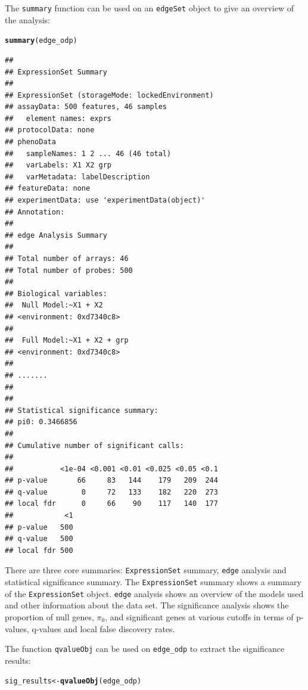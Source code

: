 \documentclass{article}\usepackage[]{graphicx}\usepackage[]{color}
\makeatletter
\newcommand{\hlstd}[1]{\textcolor[rgb]{0.345,0.345,0.345}{#1}}%
\newcommand{\hlkwb}[1]{\textcolor[rgb]{0.69,0.353,0.396}{#1}}%
\newcommand{\hlkwd}[1]{\textcolor[rgb]{0.737,0.353,0.396}{\textbf{#1}}}%
\newenvironment{kframe}{%
 \def\at@end@of@kframe{}%
 \ifinner\ifhmode%
  \def\at@end@of@kframe{\end{minipage}}%
  \begin{minipage}{\columnwidth}%
 \fi\fi%
 \def\FrameCommand##1{\hskip\@totalleftmargin \hskip-\fboxsep
 \colorbox{shadecolor}{##1}\hskip-\fboxsep
     \hskip-\linewidth \hskip-\@totalleftmargin \hskip\columnwidth}%
 \MakeFramed {\advance\hsize-\width
   \@totalleftmargin\z@ \linewidth\hsize
   \@setminipage}}%
 {\par\unskip\endMakeFramed%
 \at@end@of@kframe}
\newenvironment{knitrout}{}{} %
\makeatother
\begin{document}
The {\tt summary} function can be used on an {\tt edgeSet} object to give an overview of the analysis:
\begin{knitrout}
\color{fgcolor}\begin{kframe}
\begin{alltt}
\hlkwd{summary}\hlstd{(edge_odp)}
\end{alltt}
\begin{verbatim}
## 
## ExpressionSet Summary 
##  
## ExpressionSet (storageMode: lockedEnvironment)
## assayData: 500 features, 46 samples 
##   element names: exprs 
## protocolData: none
## phenoData
##   sampleNames: 1 2 ... 46 (46 total)
##   varLabels: X1 X2 grp
##   varMetadata: labelDescription
## featureData: none
## experimentData: use 'experimentData(object)'
## Annotation:  
## 
## edge Analysis Summary 
##  
## Total number of arrays: 46 
## Total number of probes: 500 
##  
## Biological variables: 
## 	Null Model:~X1 + X2
## <environment: 0xd7340c8>
## 
## 	Full Model:~X1 + X2 + grp
## <environment: 0xd7340c8>
## 
## ....... 
##  
## 
## Statistical significance summary:
## pi0:	0.3466856	
## 
## Cumulative number of significant calls:
## 
##           <1e-04 <0.001 <0.01 <0.025 <0.05 <0.1
## p-value       66     83   144    179   209  244
## q-value        0     72   133    182   220  273
## local fdr      0     66    90    117   140  177
##            <1
## p-value   500
## q-value   500
## local fdr 500
\end{verbatim}
\end{kframe}
\end{knitrout}
There are three core summaries: {\tt ExpressionSet} summary, {\tt edge} analysis and statistical significance summary. The {\tt ExpressionSet} summary shows a summary of the {\tt ExpressionSet} object. {\tt edge} analysis shows an overview of the models used and other information about the data set. The significance analysis shows the proportion of null genes, $\pi_{0}$, and significant genes at various cutoffs in terms of p-values, q-values and local false discovery rates.

The function {\tt qvalueObj} can be used on {\tt edge\_odp} to extract the significance results:
\begin{knitrout}
\color{fgcolor}\begin{kframe}
\begin{alltt}
\hlstd{sig_results} \hlkwb{<-} \hlkwd{qvalueObj}\hlstd{(edge_odp)}
\end{alltt}
\end{kframe}
\end{knitrout}
\end{document}
